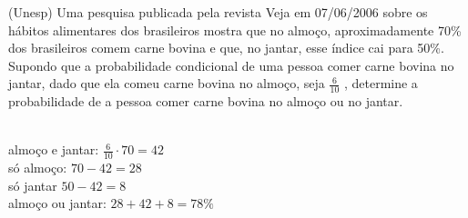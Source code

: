 \begin{ex}
  (Unesp) Uma pesquisa publicada pela revista Veja em 07/06/2006 sobre os hábitos alimentares dos brasileiros mostra que no almoço, aproximadamente 70\% dos brasileiros comem carne bovina e que, no jantar, esse índice cai para 50\%. Supondo que a probabilidade condicional de uma pessoa comer carne bovina no jantar, dado que ela comeu carne bovina no almoço, seja $\frac{6}{10}$ , determine a probabilidade de a pessoa comer carne bovina no almoço ou no jantar.
    \begin{sol}
      \phantom{A}\\
      almoço e jantar: $\frac{6}{10}\cdot70 = 42$ \\
      só almoço: $70-42=28$ \\
      só jantar $50-42=8$ \\
      almoço ou jantar: $28+42+8=78\%$ \\
    
    \end{sol}
\end{ex}